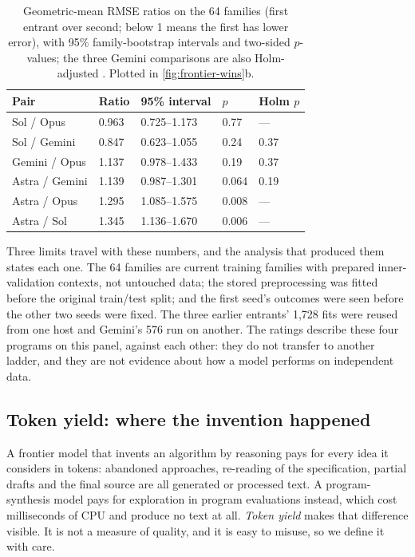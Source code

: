 \begin{table}[t]
\caption{Geometric-mean RMSE ratios on the 64 families (first entrant over second; below 1 means the
first has lower error), with 95\% family-bootstrap intervals and two-sided $p$-values; the three
Gemini comparisons are also Holm-adjusted \pre. Plotted in \cref{fig:frontier-wins}b.}
\label{tab:magnitude}
\centering\sffamily\footnotesize\lining
\begin{tabular}{@{}lllll@{}}
\toprule
Pair & Ratio & 95\% interval & $p$ & Holm $p$ \\
\midrule
Sol / Opus & 0.963 & 0.725--1.173 & 0.77 & --- \\
Sol / Gemini & 0.847 & 0.623--1.055 & 0.24 & 0.37 \\
Gemini / Opus & 1.137 & 0.978--1.433 & 0.19 & 0.37 \\
Astra / Gemini & 1.139 & 0.987--1.301 & 0.064 & 0.19 \\
Astra / Opus & 1.295 & 1.085--1.575 & 0.008 & --- \\
Astra / Sol & 1.345 & 1.136--1.670 & 0.006 & --- \\
\bottomrule
\end{tabular}
\end{table}

Three limits travel with these numbers, and the analysis that produced them states each one. The 64
families are current training families with prepared inner-validation contexts, not untouched data;
the stored preprocessing was fitted before the original train/test split; and the first seed's
outcomes were seen before the other two seeds were fixed. The three earlier entrants' 1,728 fits
were reused from one host and Gemini's 576 run on another. The ratings describe these four programs
on this panel, against each other: they do not transfer to another ladder, and they are not
evidence about how a model performs on independent data.

\subsection{Token yield: where the invention happened}
\label{sec:yield}

A frontier model that invents an algorithm by reasoning pays for every idea it considers in tokens:
abandoned approaches, re-reading of the specification, partial drafts and the final source are all
generated or processed text. A program-synthesis model pays for exploration in program evaluations
instead, which cost milliseconds of CPU and produce no text at all. \emph{Token yield} makes that
difference visible. It is not a measure of quality, and it is easy to misuse, so we define it with
care.

